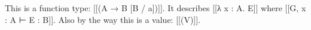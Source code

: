 This is a function type: [[(A → B [B / a])]]. It describes [[λ x : A. E]] where [[G, x : A ⊢ E : B]]. Also by the way this is a value: [[(V)]].
